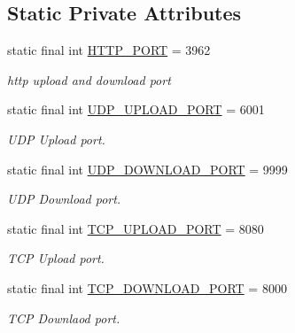 \subsection*{Static Private Attributes}
\begin{DoxyCompactItemize}
\item 
\hypertarget{classcom_1_1server_1_1Server_a195a2fd46a6d4ed383f37b372acf4a6e}{static final int \hyperlink{classcom_1_1server_1_1Server_a195a2fd46a6d4ed383f37b372acf4a6e}{H\-T\-T\-P\-\_\-\-P\-O\-R\-T} = 3962}\label{classcom_1_1server_1_1Server_a195a2fd46a6d4ed383f37b372acf4a6e}

\begin{DoxyCompactList}\small\item\em http upload and download port \end{DoxyCompactList}\item 
\hypertarget{classcom_1_1server_1_1Server_a667e9966e73c481be93420c2678b5e44}{static final int \hyperlink{classcom_1_1server_1_1Server_a667e9966e73c481be93420c2678b5e44}{U\-D\-P\-\_\-\-U\-P\-L\-O\-A\-D\-\_\-\-P\-O\-R\-T} = 6001}\label{classcom_1_1server_1_1Server_a667e9966e73c481be93420c2678b5e44}

\begin{DoxyCompactList}\small\item\em U\-D\-P Upload port. \end{DoxyCompactList}\item 
\hypertarget{classcom_1_1server_1_1Server_a75ebb782b7f93a00767c42ecc06e948f}{static final int \hyperlink{classcom_1_1server_1_1Server_a75ebb782b7f93a00767c42ecc06e948f}{U\-D\-P\-\_\-\-D\-O\-W\-N\-L\-O\-A\-D\-\_\-\-P\-O\-R\-T} = 9999}\label{classcom_1_1server_1_1Server_a75ebb782b7f93a00767c42ecc06e948f}

\begin{DoxyCompactList}\small\item\em U\-D\-P Download port. \end{DoxyCompactList}\item 
\hypertarget{classcom_1_1server_1_1Server_a2dc0717a250239ef76137e0d76d717a5}{static final int \hyperlink{classcom_1_1server_1_1Server_a2dc0717a250239ef76137e0d76d717a5}{T\-C\-P\-\_\-\-U\-P\-L\-O\-A\-D\-\_\-\-P\-O\-R\-T} = 8080}\label{classcom_1_1server_1_1Server_a2dc0717a250239ef76137e0d76d717a5}

\begin{DoxyCompactList}\small\item\em T\-C\-P Upload port. \end{DoxyCompactList}\item 
\hypertarget{classcom_1_1server_1_1Server_a0a6de32d93cfa5d736a594c1b163a555}{static final int \hyperlink{classcom_1_1server_1_1Server_a0a6de32d93cfa5d736a594c1b163a555}{T\-C\-P\-\_\-\-D\-O\-W\-N\-L\-O\-A\-D\-\_\-\-P\-O\-R\-T} = 8000}\label{classcom_1_1server_1_1Server_a0a6de32d93cfa5d736a594c1b163a555}

\begin{DoxyCompactList}\small\item\em T\-C\-P Downlaod port. \end{DoxyCompactList}\end{DoxyCompactItemize}


